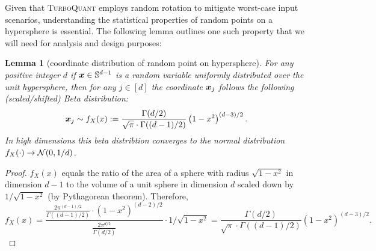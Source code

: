 \documentclass[11pt]{article}
\newtheorem{lemma}{Lemma}
\newcommand{\TurboQuant}{\textsc{TurboQuant}\xspace}
\begin{document}
Given that \TurboQuant employs random rotation to mitigate worst-case input scenarios, understanding the statistical properties of random points on a hypersphere is essential. 
The following lemma outlines one such property that we will need for analysis and design purposes:

\begin{lemma}[coordinate distribution of random point on hypersphere]\label{lem_coordinate_distribution}
    For any positive integer $d$ if ${\bm x} \in \mathbb{S}^{d-1}$ is a random variable uniformly distributed over the unit hypersphere, then for any $j \in [d]$ the coordinate ${\bm x}_j$ follows the following (scaled/shifted) Beta distribution:
    \[
    {\bm x}_j \sim f_{X}(x) := \frac{\Gamma(d/2)}{\sqrt{\pi} \cdot \Gamma((d-1)/2)} \left( 1 - x^2 \right)^{(d-3)/2}.
    \]
    In high dimensions this beta distribtion converges to the normal distribution $f_{X}(\cdot) \to \mathcal{N}(0, 1/d)$.
\end{lemma}
\begin{proof}
$f_X(x)$ equals the ratio of the area of a sphere with radius $\sqrt{1-x^2}$ in dimension $d-1$ to the volume of a unit sphere in dimension $d$ scaled down by $1/\sqrt{1-x^2}$ (by Pythagorean theorem). 
Therefore,
\[
f_X(x) = \frac{\frac{2 \pi^{(d-1)/2}}{\Gamma((d-1)/2)} \cdot (1-x^2)^{(d-2)/2}}{\frac{2 \pi^{d/2}}{\Gamma(d/2)}} \cdot 1/\sqrt{1-x^2}= \frac{\Gamma(d/2)}{\sqrt{\pi} \cdot \Gamma((d-1)/2)} \left( 1 - x^2 \right)^{(d-3)/2}.
\]
\end{proof}
\end{document}
